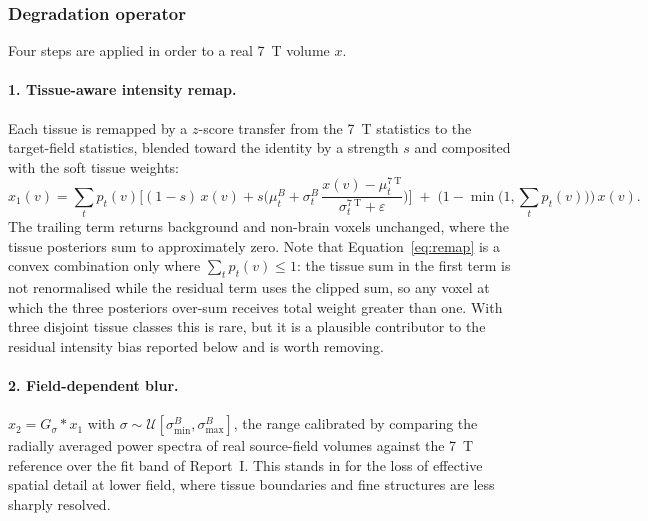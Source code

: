 \documentclass[11pt,a4paper]{article}
\newcommand{\reportone}{Report~I}
\begin{document}
\subsubsection{Degradation operator}

Four steps are applied in order to a real \SI{7}{\tesla} volume $x$.

\paragraph{1. Tissue-aware intensity remap.} Each tissue is remapped by a $z$-score transfer from the
\SI{7}{\tesla} statistics to the target-field statistics, blended toward the identity by a strength $s$
and composited with the soft tissue weights:
\begin{equation}
  x_1(v) = \sum_{t} p_t(v)\Big[(1-s)\,x(v) + s\Big(\mu^{B}_{t} + \sigma^{B}_{t}\,
  \frac{x(v) - \mu^{\SI{7}{\tesla}}_{t}}{\sigma^{\SI{7}{\tesla}}_{t} + \varepsilon}\Big)\Big]
  \;+\; \Big(1 - \min\big(1, \textstyle\sum_t p_t(v)\big)\Big)\,x(v).
  \label{eq:remap}
\end{equation}
The trailing term returns background and non-brain voxels unchanged, where the tissue posteriors sum to
approximately zero. Note that Equation~\ref{eq:remap} is a convex combination only where
$\sum_t p_t(v) \le 1$: the tissue sum in the first term is not renormalised while the residual term uses
the clipped sum, so any voxel at which the three posteriors over-sum receives total weight greater than
one. With three disjoint tissue classes this is rare, but it is a plausible contributor to the residual
intensity bias reported below and is worth removing.

\paragraph{2. Field-dependent blur.} $x_2 = G_\sigma \ast x_1$ with
$\sigma \sim \mathcal{U}[\sigma^{B}_{\min}, \sigma^{B}_{\max}]$, the range calibrated by comparing the
radially averaged power spectra of real source-field volumes against the \SI{7}{\tesla} reference over
the fit band of \reportone{}. This stands in for the loss of effective spatial detail at lower field,
where tissue boundaries and fine structures are less sharply resolved.
\end{document}

